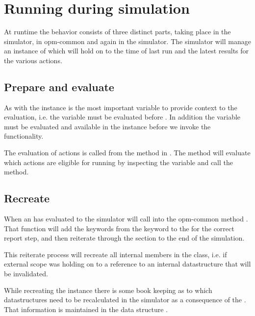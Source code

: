 \section{Running \actionx{} during simulation}
At runtime the \actionx{} behavior consists of three distinct parts, taking
place in the simulator, in opm-common and again in the simulator. The simulator
will manage an instance of  which will hold on to the
time of last run and the latest results for the various actions.

\subsection{Prepare and evaluate}
As with \udq{} the  instance is the most important
variable to provide context to the \actionx{} evaluation, i.e. the
 variable must be evaluated before \actionx{}. In
addition the \udq{} variable must be evaluated and available in the
 instance before we invoke the \actionx{}
functionality.

The evaluation of actions is called from the method 
in . The method will evaluate which actions are eligible for
running by inspecting the  variable and call the
 method.

\subsection{Recreate }
When an \actionx{} has evaluated to  the simulator will call
into the opm-common method .
That function will add the keywords from the \actionx{} keyword to the
 for the correct report step, and then reiterate
through the  section to the end of the simulation.

This reiterate process will recreate all internal members in the
 class, i.e. if external scope was holding on to a
reference to an internal  datastructure that will be
invalidated.

While recreating the  instance there is some book keeping
as to which datastructures need to be recalculated in the simulator as a
consequence of the \actionx{}. That information is maintained in the data
structure .


